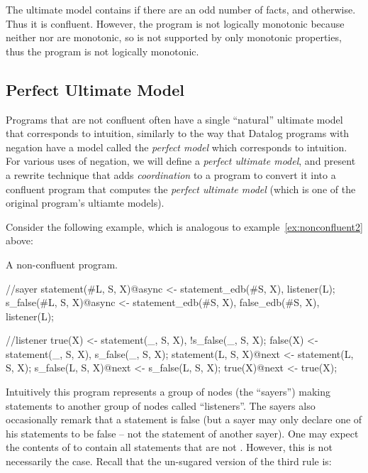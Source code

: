 The ultimate model contains  if there are an odd number of  facts, and  otherwise.  Thus it is confluent.  However, the program is not logically monotonic because neither  nor  are monotonic, so  is not supported by only monotonic properties, thus the program is not logically monotonic.

\subsection{Perfect Ultimate Model}
Programs that are not confluent often have a single ``natural'' ultimate model that corresponds to intuition, similarly to the way that Datalog programs with negation have a model called the {\em perfect model} which corresponds to intuition.  For various uses of negation, we will define a {\em perfect ultimate model}, and present a rewrite technique that adds {\em coordination} to a \lang program to convert it into a confluent \lang program that computes the {\em perfect ultimate model} (which is one of the original program's ultiamte models).

Consider the following example, which is analogous to example~\ref{ex:nonconfluent2} above:

\begin{example}
\label{ex:sayers}
A non-confluent \lang program.

\begin{Dedalus}
//sayer
statement(#L, S, X)@async <- statement_edb(#S, X),
                             listener(L);
s_false(#L, S, X)@async <- statement_edb(#S, X),
                           false_edb(#S, X),
                           listener(L);

//listener
true(X) <- statement(_, S, X), !s_false(_, S, X);
false(X) <- statement(_, S, X), s_false(_, S, X);
statement(L, S, X)@next <- statement(L, S, X);
s_false(L, S, X)@next <- s_false(L, S, X);
true(X)@next <- true(X);
\end{Dedalus}
\end{example}

Intuitively this program represents a group of nodes (the ``sayers'') making statements to another group of nodes called ``listeners''.  The sayers also occasionally remark that a statement is false (but a sayer may only declare one of his statements to be false -- not the statement of another sayer).  One may expect the contents of  to contain all statements that are not .  However, this is not necessarily the case.  Recall that the un-sugared version of the third rule is:

